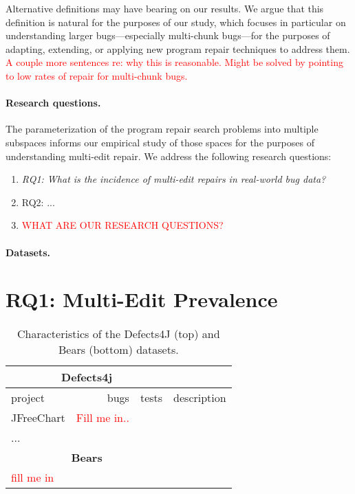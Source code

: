 \documentclass[sigconf, timestamp-false, anonymous=true]{acmart}
\newcommand\todo[1]{\textcolor{red}{#1}}
\begin{document}
Alternative definitions may have bearing on our results.  We argue that this
definition is natural for the purposes of our study, which focuses in particular
on understanding larger bugs---especially multi-chunk bugs---for the purposes of 
adapting, extending, or applying new program repair techniques to address them. 
\todo{A couple more sentences re: why this is reasonable. Might be solved by 
pointing to low rates of repair for multi-chunk bugs.}

\paragraph{Research questions.}  The parameterization of the program repair
search problems into multiple subspaces informs our empirical study of those
spaces for the purposes of understanding multi-edit repair.  We address the
following research questions:

\begin{enumerate}
\item \emph{RQ1: What is the incidence of multi-edit repairs in real-world bug data?}
\item RQ2: ...
\item \todo{WHAT ARE OUR RESEARCH QUESTIONS?}
\end{enumerate}

\paragraph{Datasets.}  

\section{RQ1: Multi-Edit Prevalence}
\label{sec:data-rq1}

\begin{table}
\begin{tabular}{lrrl}
\toprule
\multicolumn{3}{c}{\textbf{Defects4j}} \\
\midrule
project & bugs & tests & description \\
\midrule
JFreeChart  & \todo{Fill me in..} \\
... \\
\midrule
\multicolumn{3}{c}{\textbf{Bears}} \\
\midrule
\todo{fill me in} \\
\bottomrule
\end{tabular}
\caption{\label{tab:data} Characteristics of the Defects4J (top) and Bears (bottom) datasets.}
\end{table}
\end{document}
